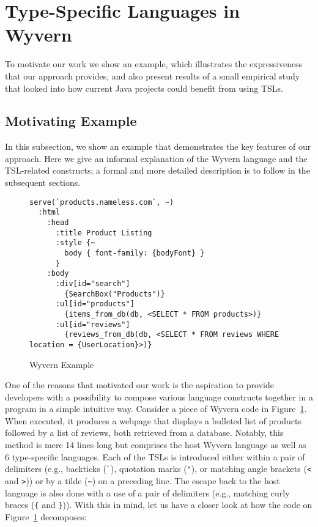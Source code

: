 
\section{Type-Specific Languages in Wyvern}
\label{s:motivation}

To motivate our work we show an example, which illustrates the expressiveness that our approach provides, and also present results of a small empirical study that looked into how current Java projects could  benefit from using TSLs.

\subsection{Motivating Example}

In this subsection, we show an example that demonstrates the key features of our approach. Here we give an informal explanation of the Wyvern language and the TSL-related constructs; a formal and more detailed description is to follow in the subsequent sections.


\begin{figure}[t]
\begin{lstlisting}
serve(`products.nameless.com`, ~)
  :html
    :head
      :title Product Listing
      :style {~
        body { font-family: {bodyFont} }
      }
    :body
      :div[id="search"]
        {SearchBox("Products")}
      :ul[id="products"]
        {items_from_db(db, <SELECT * FROM products>)}
      :ul[id="reviews"]
        {reviews_from_db(db, <SELECT * FROM reviews WHERE location = {UserLocation}>)}
\end{lstlisting}
\caption{Wyvern Example}
\label{f-example}
\end{figure}


One of the reasons that motivated our work is the aspiration to provide developers with a possibility to compose various language constructs together in a program in a simple intuitive way. Consider a piece of Wyvern code in Figure~\ref{f-example}. When executed, it produces a webpage that displays a bulleted list of products followed by a list of reviews, both retrieved from a database. Notably, this method is mere 14 lines long but comprises the host Wyvern language as well as 6 type-specific languages. Each of the TSLs is introduced either within a pair of delimiters (e.g., backticks (\lstinline{`}), quotation marks (\lstinline{"}), or matching angle brackets (\lstinline{<} and \lstinline{>})) or by a tilde (\lstinline{~}) on a preceding line. The escape back to the host language is also done with a use of a pair of delimiters (e.g., matching curly braces (\lstinline|{| and \lstinline|}|)). With this in mind, let us have a closer look at how the code on Figure~\ref{f-example} decomposes:

